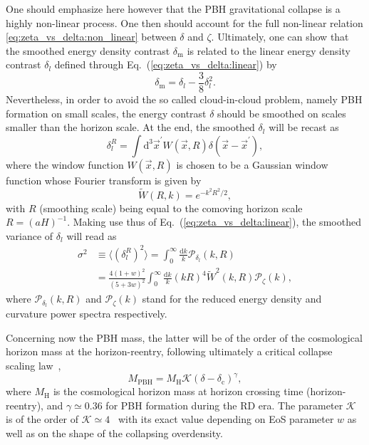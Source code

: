 \documentclass[nofootinbib,aps,a4paper,letterpaper,superscriptaddress,
twocolumn,times]{revtex4}
\newcommand{\beq}{\begin{equation}}
\newcommand{\eeq}{\end{equation}}
\newcommand{\Eq}[1]{Eq.~(\ref{#1})}
\renewcommand{\(}{\left(}
\renewcommand{\)}{\right)}
\renewcommand{\(}{\left(}
\renewcommand{\)}{\right)}
\renewcommand{\[}{\left[}
\renewcommand{\]}{\right]}
\begin{document}
One should emphasize here however that the PBH gravitational collapse is a highly non-linear process. One then should account for the full non-linear relation \eqref{eq:zeta_vs_delta:non_linear} between $\delta$ and $\zeta$. Ultimately, one can show that the smoothed energy density contrast $\delta_\mathrm{m}$ is related to the linear energy 
density contrast $\delta_l$ defined through \Eq{eq:zeta_vs_delta:linear} by
~\cite{DeLuca:2019qsy,Young:2019yug}
\beq\label{eq:delta_m_smoothed}
\delta_\mathrm{m} = \delta_l - \frac{3}{8}\delta^2_l.
\eeq
Nevertheless, in order to avoid the so called cloud-in-cloud problem, namely PBH formation on small scales, the energy contrast $\delta$ should be smoothed on scales smaller than the horizon scale. At the end, the smoothed $\delta_l$ will be recast as
\beq
\delta^R_l = \int \mathrm{d}^3\vec{x}^\prime W(\vec{x},R)\delta(\vec{x}-\vec{x}^\prime),
\eeq
where the window function $W(\vec{x},R)$ is chosen to be a Gaussian window function whose Fourier transform is given by~\cite{Young:2014ana}
\beq\label{eq:Gaussian_window_function}
\tilde{W}(R,k) = e^{-k^2R^2/2},
\eeq
with $R$ (smoothing scale) being equal to the comoving horizon scale $R=(aH)^{-1}$. Making use thus of \Eq{eq:zeta_vs_delta:linear}, the smoothed variance of $\delta_l$ will read as
\beq\label{eq:sigma}
\begin{split}
\sigma^2 & \equiv \langle \left(\delta^{R}_l\right)^2\rangle = \int_0^\infty\frac{\mathrm{d}k}{k}\mathcal{P}_{\delta_l}(k,R)  \\ & = \frac{4(1+w)^2}{(5+3w)^2}\int_0^\infty\frac{\mathrm{d}k}{k}(kR)^4 \tilde{W}^2(k,R) \mathcal{P}_\zeta(k),
\end{split}
\eeq
where $\mathcal{P}_{\delta_l}(k,R)$ and $\mathcal{P}_\zeta(k)$ stand for the reduced energy density and curvature power spectra respectively.

Concerning now the PBH mass, the latter will be of the order of the cosmological horizon mass at the horizon-reentry, following ultimately a critical collapse scaling law~\cite{Niemeyer:1997mt,Niemeyer:1999ak,Musco:2008hv,Musco:2012au},  
\beq\label{eq:PBH_mass_scaling_law}
M_\mathrm{PBH} = M_\mathrm{H}\mathcal{K}(\delta-\delta_\mathrm{c})^\gamma,
\eeq
where $M_\mathrm{H}$ is the cosmological horizon mass at horizon crossing time (horizon-reentry), and $\gamma \simeq 0.36$ for PBH formation during the RD era. The parameter $\mathcal{K}$ is of the order of $\mathcal{K}\simeq 4$~\cite{Musco:2008hv} with its exact value depending on EoS parameter $w$ as well as on the shape of the collapsing overdensity.
\end{document}
